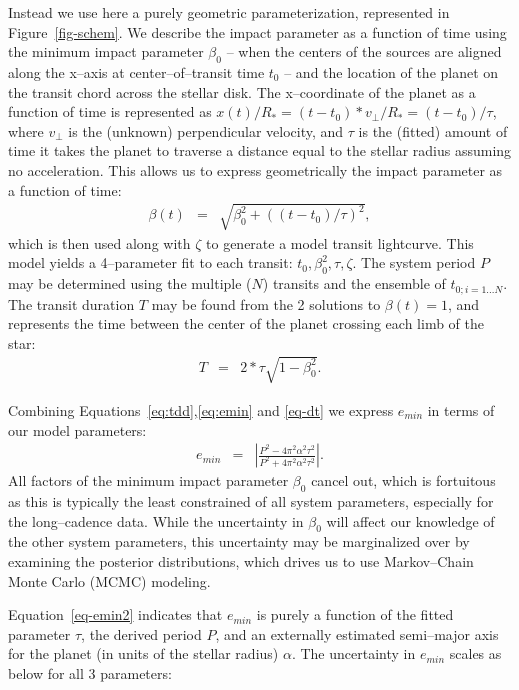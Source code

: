 Instead we use here a purely geometric parameterization, represented
in Figure~\ref{fig-schem}.  We describe the impact parameter as a
function of time using the minimum impact parameter $\beta_0$ -- when
the centers of the sources are aligned along the x--axis at
center--of--transit time $t_0$ -- and the location of the planet on
the transit chord across the stellar disk.  The x--coordinate of the
planet as a function of time is represented as $x(t) / R_* = (t - t_0)
* v_\perp / R_* = (t - t_0) / \tau$, where $v_\perp$ is the (unknown)
perpendicular velocity, and $\tau$ is the (fitted) amount of time it
takes the planet to traverse a distance equal to the stellar radius
assuming no acceleration.  This allows us to express geometrically the
impact parameter as a function of time:
\begin{eqnarray}
\beta(t) & = & \sqrt{\beta_0^2 + \left((t - t_0) / \tau\right)^2},
\end{eqnarray}
which is then used along with $\zeta$ to generate a model transit
lightcurve.
This model yields a 4--parameter fit to each transit: $t_0, \beta_0^2,
\tau, \zeta$.  The system period $P$ may be determined using the
multiple ($N$) transits and the ensemble of $t_{0;i=1...N}$.  The
transit duration $T$ may be found from the 2 solutions to $\beta(t) =
1$, and represents the time between the center of the planet crossing
each limb of the star:
\begin{eqnarray}
T & = & 2 * \tau \sqrt{1 - \beta_0^2}.
\label{eq-dt}
\end{eqnarray}

Combining Equations~\ref{eq:tdd},\ref{eq:emin} and \ref{eq-dt} we express $e_{min}$ in terms of our model
parameters:
\begin{eqnarray}
e_{min} & = & \left| \frac{P^{2} - 4 \pi^{2} \alpha^{2} \tau^{2}}{P^{2} + 4 \pi^{2} \alpha^{2} \tau^{2}} \right|.
\label{eq-emin2}
\end{eqnarray}
All factors of the minimum impact parameter $\beta_0$ cancel out,
which is fortuitous as this is typically the least constrained of all
system parameters, especially for the long--cadence \kepler data.
While the uncertainty in $\beta_0$ will affect our knowledge of the
other system parameters, this uncertainty may be marginalized over by
examining the posterior distributions, which drives us to use
Markov--Chain Monte Carlo (MCMC) modeling.

Equation~\ref{eq-emin2} indicates that $e_{min}$ is purely a function
of the fitted parameter $\tau$, the derived period $P$, and an
externally estimated semi--major axis for the planet (in units of the
stellar radius) $\alpha$.  The uncertainty in $e_{min}$ scales as
below for all 3 parameters:

